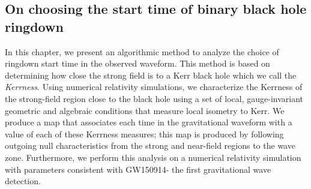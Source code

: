 


\subsection{On choosing the start time of binary black hole ringdown}
In this chapter, we present an algorithmic method to analyze the choice of ringdown start time in
the observed waveform. This method is based on determining how close the strong
field is to a Kerr black hole which we call the \textit{Kerrness}. Using numerical relativity
simulations, we characterize the Kerrness of the strong-field region close to
the black hole using a set of local, gauge-invariant geometric and algebraic
conditions that measure local isometry to Kerr. We produce a map that
associates each time in the gravitational waveform with a value of each of
these Kerrness measures; this map is produced by following outgoing null
characteristics from the strong and near-field regions to the wave zone. Furthermore, we
perform this analysis on a numerical relativity simulation with parameters
consistent with GW150914- the first gravitational wave detection. 

